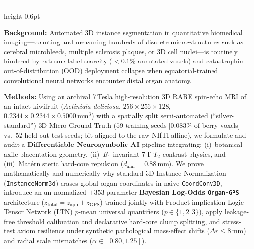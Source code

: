 \documentclass[10pt,a4paper]{article}
\renewcommand{\_}{\origunderscore\allowbreak}
\begin{document}
\vspace{0.32cm}
\hrule height 0.6pt \relax
\vspace{0.28cm}

\begin{keybox}
\footnotesize\setlength{\parskip}{0.32em}
\textbf{Background:} Automated 3D instance segmentation in quantitative biomedical imaging---counting and measuring hundreds of discrete micro-structures such as cerebral microbleeds, multiple sclerosis plaques, or 3D cell nuclei---is routinely hindered by extreme label scarcity ($<0.1\%$ annotated voxels) and catastrophic out-of-distribution (OOD) deployment collapse when equatorial-trained convolutional neural networks encounter distal organ anatomy.

\textbf{Methods:} Using an archival 7\,Tesla high-resolution 3D RARE spin-echo MRI of an intact kiwifruit (\textit{Actinidia deliciosa}, $256\times 256\times 128$, $0.2344\times 0.2344\times 0.5000\,\text{mm}^3$) with a spatially split semi-automated (``silver-standard'') 3D Micro-Ground-Truth ($59$ training seeds [$0.083\%$ of berry voxels] vs.\ $52$ held-out test seeds; bit-aligned to the raw NIfTI affine), we formulate and audit a \textbf{Differentiable Neurosymbolic AI} pipeline integrating: (i)~botanical axile-placentation geometry, (ii)~$B_1$-invariant 7\,T $T_2$ contrast physics, and (iii)~Mat\'ern steric hard-core repulsion ($d_{\min} = 0.88\,\text{mm}$). We prove mathematically and numerically why standard 3D Instance Normalization (\texttt{InstanceNorm3d}) erases global organ coordinates in naive \texttt{CoordConv3D}, introduce an un-normalized $+353$-parameter \textbf{Bayesian Log-Odds \texttt{Organ-GPS}} architecture ($z_{\text{total}} = z_{\text{app}} + z_{\text{GPS}}$) trained jointly with Product-implication Logic Tensor Network (LTN) $p$-mean universal quantifiers ($p \in \{1,2,3\}$), apply leakage-free threshold calibration and declarative hard-core clump splitting, and stress-test axiom resilience under synthetic pathological mass-effect shifts ($\Delta r \le 8\,\text{mm}$) and radial scale mismatches ($\alpha \in [0.80, 1.25]$).


\end{keybox}
\end{document}
